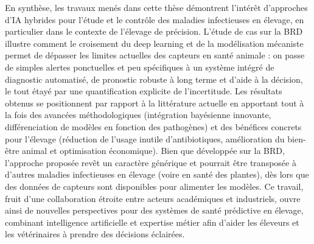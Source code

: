 En synthèse, les travaux menés dans cette thèse démontrent l’intérêt d’approches d’IA hybrides pour l’étude et le contrôle des maladies infectieuses en élevage, en particulier dans le contexte de l’élevage de précision. L’étude de cas sur la BRD illustre comment le croisement du deep learning et de la modélisation mécaniste permet de dépasser les limites actuelles des capteurs en santé animale : on passe de simples alertes ponctuelles et peu spécifiques à un système intégré de diagnostic automatisé, de pronostic robuste à long terme et d’aide à la décision, le tout étayé par une quantification explicite de l’incertitude. Les résultats obtenus se positionnent par rapport à la littérature actuelle en apportant tout à la fois des avancées méthodologiques (intégration bayésienne innovante, différenciation de modèles en fonction des pathogènes) et des bénéfices concrets pour l’élevage (réduction de l’usage inutile d’antibiotiques, amélioration du bien-être animal et optimisation économique). Bien que développée sur la BRD, l’approche proposée revêt un caractère générique et pourrait être transposée à d’autres maladies infectieuses en élevage (voire en santé des plantes), dès lors que des données de capteurs sont disponibles pour alimenter les modèles. Ce travail, fruit d’une collaboration étroite entre acteurs académiques et industriels, ouvre ainsi de nouvelles perspectives pour des systèmes de santé prédictive en élevage, combinant intelligence artificielle et expertise métier afin d’aider les éleveurs et les vétérinaires à prendre des décisions éclairées.
